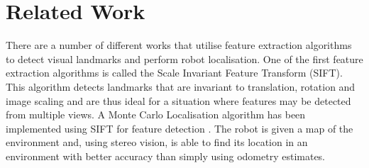 \documentclass[11pt]{report}
\begin{document}
%
%
%
%
%


\section{Related Work}
\label{sec:relatedWork}
There are a number of different works that utilise feature extraction algorithms to detect visual landmarks and perform robot localisation. One of the first feature extraction algorithms is called the Scale Invariant Feature Transform (SIFT)\cite{Lowe2004}. This algorithm detects landmarks that are invariant to translation, rotation and image scaling and are thus ideal for a situation where features may be detected from multiple views. A Monte Carlo Localisation algorithm has been implemented using SIFT for feature detection \cite{Gil}. The robot is given a map of the environment and, using stereo vision, is able to find its location in an environment with better accuracy than simply using odometry estimates.\\
\end{document}
